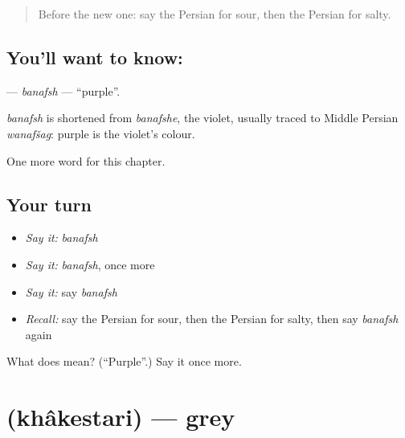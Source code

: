\label{lesson:FA-C127-banafsh}



\begin{quote}
Before the new one: say the Persian for sour, then the Persian for salty.
\end{quote}

\subsection*{You'll want to know: }
\textbf{} — \emph{banafsh} — \textquotedblleft{}purple\textquotedblright{}.

\begin{cousinweb}
\emph{banafsh} is shortened from \emph{banafshe}, the violet, usually traced to Middle Persian \emph{wanafšag}: purple is the violet's colour.
\end{cousinweb}

\begin{grammarlens}[title={What you've built}]
One more word for this chapter.
\end{grammarlens}

\subsection*{Your turn}
\begin{itemize}
\raggedright
  \item \emph{Say it:} \emph{banafsh}
  \item \emph{Say it:} \emph{banafsh}, once more
  \item \emph{Say it:} say \emph{banafsh}
  \item \emph{Recall:} say the Persian for sour, then the Persian for salty, then say \emph{banafsh} again
\end{itemize}

\begin{tcolorbox}[breakable,colback=teal!4,colframe=teal!35!black,title={Before you move on}]
What does  mean? (\textquotedblleft{}Purple\textquotedblright{}.) Say it once more.
\end{tcolorbox}
\section[\texorpdfstring{\fa{خاکستری} (khâkestari)}{خاکستری (khâkestari)}]{ (khâkestari) — grey}

\label{lesson:FA-C127-khakestari}



